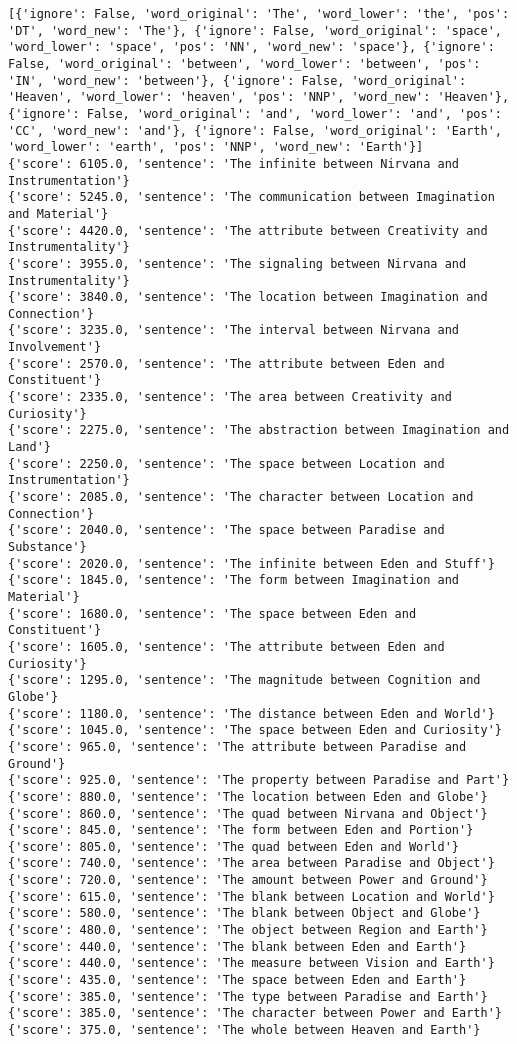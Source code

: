 \documentclass[12pt,a4paper,oneside]{book}
\begin{document}
\begin{verbatim}
[{'ignore': False, 'word_original': 'The', 'word_lower': 'the', 'pos': 'DT', 'word_new': 'The'}, {'ignore': False, 'word_original': 'space', 'word_lower': 'space', 'pos': 'NN', 'word_new': 'space'}, {'ignore': False, 'word_original': 'between', 'word_lower': 'between', 'pos': 'IN', 'word_new': 'between'}, {'ignore': False, 'word_original': 'Heaven', 'word_lower': 'heaven', 'pos': 'NNP', 'word_new': 'Heaven'}, {'ignore': False, 'word_original': 'and', 'word_lower': 'and', 'pos': 'CC', 'word_new': 'and'}, {'ignore': False, 'word_original': 'Earth', 'word_lower': 'earth', 'pos': 'NNP', 'word_new': 'Earth'}]
{'score': 6105.0, 'sentence': 'The infinite between Nirvana and Instrumentation'}
{'score': 5245.0, 'sentence': 'The communication between Imagination and Material'}
{'score': 4420.0, 'sentence': 'The attribute between Creativity and Instrumentality'}
{'score': 3955.0, 'sentence': 'The signaling between Nirvana and Instrumentality'}
{'score': 3840.0, 'sentence': 'The location between Imagination and Connection'}
{'score': 3235.0, 'sentence': 'The interval between Nirvana and Involvement'}
{'score': 2570.0, 'sentence': 'The attribute between Eden and Constituent'}
{'score': 2335.0, 'sentence': 'The area between Creativity and Curiosity'}
{'score': 2275.0, 'sentence': 'The abstraction between Imagination and Land'}
{'score': 2250.0, 'sentence': 'The space between Location and Instrumentation'}
{'score': 2085.0, 'sentence': 'The character between Location and Connection'}
{'score': 2040.0, 'sentence': 'The space between Paradise and Substance'}
{'score': 2020.0, 'sentence': 'The infinite between Eden and Stuff'}
{'score': 1845.0, 'sentence': 'The form between Imagination and Material'}
{'score': 1680.0, 'sentence': 'The space between Eden and Constituent'}
{'score': 1605.0, 'sentence': 'The attribute between Eden and Curiosity'}
{'score': 1295.0, 'sentence': 'The magnitude between Cognition and Globe'}
{'score': 1180.0, 'sentence': 'The distance between Eden and World'}
{'score': 1045.0, 'sentence': 'The space between Eden and Curiosity'}
{'score': 965.0, 'sentence': 'The attribute between Paradise and Ground'}
{'score': 925.0, 'sentence': 'The property between Paradise and Part'}
{'score': 880.0, 'sentence': 'The location between Eden and Globe'}
{'score': 860.0, 'sentence': 'The quad between Nirvana and Object'}
{'score': 845.0, 'sentence': 'The form between Eden and Portion'}
{'score': 805.0, 'sentence': 'The quad between Eden and World'}
{'score': 740.0, 'sentence': 'The area between Paradise and Object'}
{'score': 720.0, 'sentence': 'The amount between Power and Ground'}
{'score': 615.0, 'sentence': 'The blank between Location and World'}
{'score': 580.0, 'sentence': 'The blank between Object and Globe'}
{'score': 480.0, 'sentence': 'The object between Region and Earth'}
{'score': 440.0, 'sentence': 'The blank between Eden and Earth'}
{'score': 440.0, 'sentence': 'The measure between Vision and Earth'}
{'score': 435.0, 'sentence': 'The space between Eden and Earth'}
{'score': 385.0, 'sentence': 'The type between Paradise and Earth'}
{'score': 385.0, 'sentence': 'The character between Power and Earth'}
{'score': 375.0, 'sentence': 'The whole between Heaven and Earth'}


\end{verbatim}
\end{document}
